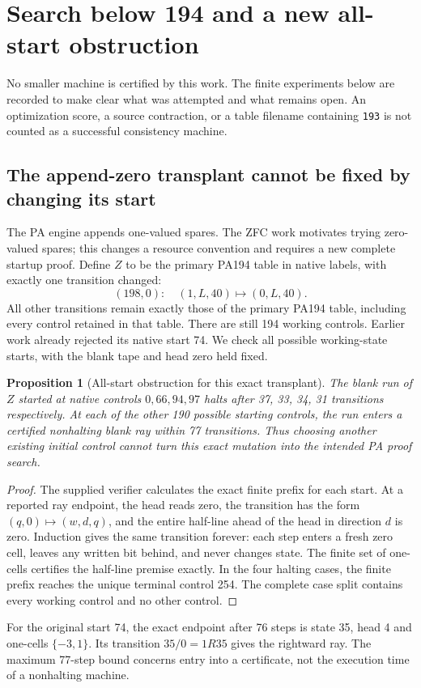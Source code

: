 \documentclass[11pt,letterpaper]{article}
\newtheorem{proposition}[theorem]{Proposition}
\begin{document}
\section{Search below 194 and a new all-start obstruction}
\label{sec:search}

No smaller machine is certified by this work. The finite experiments
below are recorded to make clear what was attempted and what remains open.
An optimization score, a source contraction, or a table filename containing
\texttt{193} is not counted as a successful consistency machine.



\subsection{The append-zero transplant cannot be fixed by changing its start}

The PA engine appends one-valued spares. The ZFC work motivates trying
zero-valued spares; this changes a resource convention and requires a new
complete startup proof. Define $Z$ to be the primary PA194 table in native
labels, with exactly one transition changed:
\[
             (198,0):\quad (1,L,40)\longmapsto(0,L,40).
\]
All other transitions remain exactly those of the primary PA194 table,
including every control retained in that table. There are still 194
working controls. Earlier work already rejected its native start 74.
We check all possible working-state starts, with the blank tape and head
zero held fixed.

\begin{proposition}[All-start obstruction for this exact transplant]
The blank run of $Z$ started at native controls $0,66,94,97$ halts after
37, 33, 34, 31 transitions respectively. At each of the other 190 possible
starting controls, the run enters a certified nonhalting blank ray within
77 transitions. Thus choosing another existing initial control cannot
turn this exact mutation into the intended PA proof search.
\end{proposition}
\begin{proof}
The supplied verifier calculates the exact finite prefix for each start.
At a reported ray endpoint, the head reads zero, the transition has the
form $(q,0)\mapsto(w,d,q)$, and the entire half-line ahead of the head in
direction $d$ is zero. Induction gives the same transition forever: each
step enters a fresh zero cell, leaves any written bit behind, and never
changes state. The finite set of one-cells certifies the half-line
premise exactly. In the four halting cases, the finite prefix reaches the
unique terminal control 254. The complete case split contains every
working control and no other control.
\end{proof}
For the original start 74, the exact endpoint after 76 steps is state 35,
head 4 and one-cells $\{-3,1\}$. Its transition $35/0=1R35$ gives the
rightward ray. The maximum 77-step bound concerns entry into a certificate,
not the execution time of a nonhalting machine.
\end{document}
